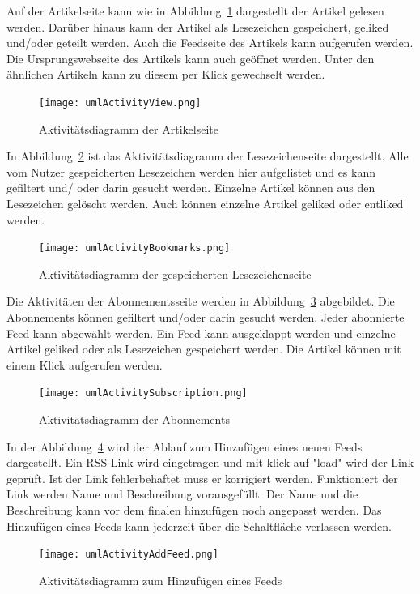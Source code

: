 Auf der Artikelseite kann wie in Abbildung~\ref{fig:umlActivityView.png} dargestellt der Artikel gelesen werden.
Darüber hinaus kann der Artikel als Lesezeichen gespeichert, geliked und/oder geteilt werden.
Auch die Feedseite des Artikels kann aufgerufen werden. Die Ursprungswebseite des Artikels kann auch geöffnet werden.
Unter den ähnlichen Artikeln kann zu diesem per Klick gewechselt werden.
\begin{figure}
    \texttt{[image: umlActivityView.png]}
    \caption{Aktivitätsdiagramm der Artikelseite}
    \label{fig:umlActivityView.png}
\end{figure}


In Abbildung~\ref{fig:umlActivityBookmarks.png} ist das Aktivitätsdiagramm der Lesezeichenseite dargestellt.
Alle vom Nutzer gespeicherten Lesezeichen werden hier aufgelistet und es kann gefiltert und/ oder darin gesucht werden.
Einzelne Artikel können aus den Lesezeichen gelöscht werden. Auch können einzelne Artikel geliked oder entliked werden.
\begin{figure}
    \texttt{[image: umlActivityBookmarks.png]}
    \caption{Aktivitätsdiagramm der gespeicherten Lesezeichenseite}
    \label{fig:umlActivityBookmarks.png}
\end{figure}

Die Aktivitäten der Abonnementsseite werden in Abbildung~\ref{fig:umlActivitySubscription.png} abgebildet.
Die Abonnements können gefiltert und/oder darin gesucht werden. Jeder abonnierte Feed kann abgewählt werden.
Ein Feed kann ausgeklappt werden und einzelne Artikel geliked oder als Lesezeichen gespeichert werden.
Die Artikel können mit einem Klick aufgerufen werden.
\begin{figure}
    \texttt{[image: umlActivitySubscription.png]}
    \caption{Aktivitätsdiagramm der Abonnements}
    \label{fig:umlActivitySubscription.png}
\end{figure}

In der Abbildung~\ref{fig:umlActivityAddFeed.png} wird der Ablauf zum Hinzufügen eines neuen Feeds dargestellt.
Ein RSS-Link wird eingetragen und mit klick auf "load" wird der Link geprüft. Ist der Link fehlerbehaftet muss er korrigiert werden.
Funktioniert der Link werden Name und Beschreibung vorausgefüllt.
Der Name und die Beschreibung kann vor dem finalen hinzufügen noch angepasst werden.
Das Hinzufügen eines Feeds kann jederzeit über die Schaltfläche verlassen werden.
\begin{figure}
    \texttt{[image: umlActivityAddFeed.png]}
    \caption{Aktivitätsdiagramm zum Hinzufügen eines Feeds}
    \label{fig:umlActivityAddFeed.png}
\end{figure}

